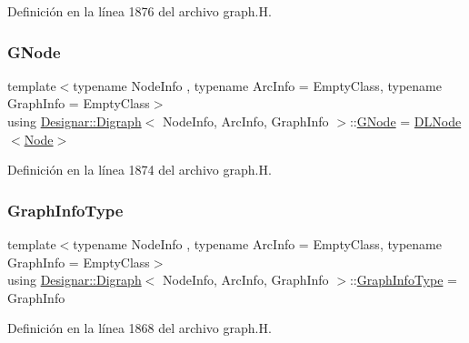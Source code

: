 Definición en la línea 1876 del archivo graph.\+H.

\mbox{\label{class_designar_1_1_digraph_a33b0d2b8820ada501522b0e67e63524a}} 
\subsubsection{\texorpdfstring{G\+Node}{GNode}}
{\footnotesize\ttfamily template$<$typename Node\+Info , typename Arc\+Info  = Empty\+Class, typename Graph\+Info  = Empty\+Class$>$ \\
using \hyperlink{class_designar_1_1_digraph}{Designar\+::\+Digraph}$<$ Node\+Info, Arc\+Info, Graph\+Info $>$\+::\hyperlink{class_designar_1_1_digraph_a33b0d2b8820ada501522b0e67e63524a}{G\+Node} =  \hyperlink{class_designar_1_1_d_l_node}{D\+L\+Node}$<$\hyperlink{class_designar_1_1_digraph_a4dc921c41a480b7946a04170e997d8ae}{Node}$>$\hspace{0.3cm}{\ttfamily [protected]}}



Definición en la línea 1874 del archivo graph.\+H.

\mbox{\label{class_designar_1_1_digraph_a2baffbb176ff86becd7452d2acc0ca74}} 
\subsubsection{\texorpdfstring{Graph\+Info\+Type}{GraphInfoType}}
{\footnotesize\ttfamily template$<$typename Node\+Info , typename Arc\+Info  = Empty\+Class, typename Graph\+Info  = Empty\+Class$>$ \\
using \hyperlink{class_designar_1_1_digraph}{Designar\+::\+Digraph}$<$ Node\+Info, Arc\+Info, Graph\+Info $>$\+::\hyperlink{class_designar_1_1_digraph_a2baffbb176ff86becd7452d2acc0ca74}{Graph\+Info\+Type} =  Graph\+Info}



Definición en la línea 1868 del archivo graph.\+H.

\mbox{\label{class_designar_1_1_digraph_a4dc921c41a480b7946a04170e997d8ae}} 
